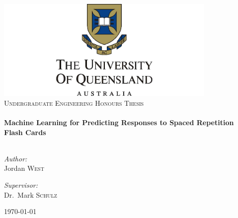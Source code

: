 \begin{titlepage}

\begin{center}


\includegraphics[width=0.8\textwidth]{./uqlogo.jpg}\\[1cm]    

\textsc{\Large Undergraduate Engineering Honours Thesis}\\[0.5cm]


\HRule \\[0.4cm]
{ \Large \bfseries Machine Learning for Predicting Responses to Spaced Repetition Flash Cards}\\[0.4cm]

\HRule \\[1.5cm]

\begin{minipage}{0.4\textwidth}
\begin{flushleft} \large
\emph{Author:}\\
Jordan \textsc{West}
\end{flushleft}
\end{minipage}
\begin{minipage}{0.4\textwidth}
\begin{flushright} \large
\emph{Supervisor:} \\
Dr.~Mark \textsc{Schulz}
\end{flushright}
\end{minipage}

\vfill

{\large \today}

\end{center}

\end{titlepage}
